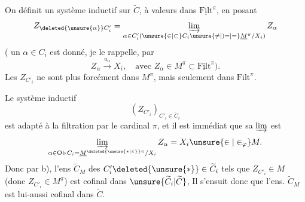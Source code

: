 On définit un système inductif sur $\widetilde C$, à valeurs dans $\underline{\mathrm{Filt}}^{\pi}$, en posant
\[
Z_{\deleted{\unsure{\alpha}}C'_i}=\varinjlim_{\alpha\in C'_i(\unsure{\in|\subset}C_i\unsure{\neq|)=|=}\underline M^{\pi}/X_i)}Z_\alpha
\]
( un $\alpha\in C_i$ est donné, je le rappelle, par
\[
Z_\alpha\xrightarrow{u_\alpha}X_i,\quad\text{avec }Z_\alpha\in M^{\pi}\subset\underline{\mathrm{Filt}}^{\pi}).
\]
Les $Z_{C'_i}$ ne sont plus forcément dans $M^{\pi}$, mais seulement dans $\mathrm{Filt}^{\pi}$. 


Le système inductif
\[
(Z_{C'_i})_{C'_i\in\widetilde C_i}
\]
est   adapté à la filtration  par le cardinal $\pi$, et il est immédiat que sa $\varinjlim$ est 
\[
\varinjlim_{\alpha\in\operatorname{Ob}C_i=\underline M^{\deleted{\unsure{\ast|\pi}}\pi}/X_i}Z_\alpha=X_i\unsure{\in|\in_{\varphi}}M.
\]
Donc par b), l'ens  $\widetilde C_M$ des $C'_i\deleted{\unsure{\ast}}\in\widetilde C_i$ tels que $Z_{C'_i}\in M$ (donc $Z_{C'_i}\in M^{\pi}$) est cofinal dans $\unsure{\widetilde C_i|\widetilde C}$, Il s'ensuit donc que l'ens. $\widetilde C_M$ est lui-aussi cofinal dans $\widetilde C$.
